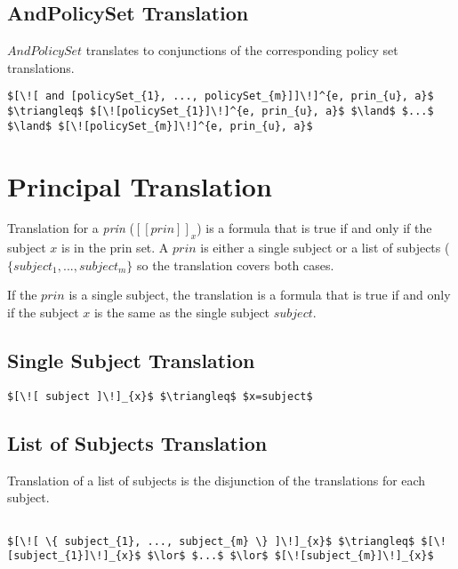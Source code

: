 \subsection{AndPolicySet Translation}
$AndPolicySet$ translates to conjunctions of the corresponding policy set translations. 

\lstset{mathescape, language=AST}  
\begin{lstlisting}[frame=single, caption={Policy Set Translation {$\colon$} AndPolicySet},label={lst:transpolicyformulaAndPolicySet}]
$[\![ and [policySet_{1}, ..., policySet_{m}]]\!]^{e, prin_{u}, a}$ $\triangleq$ $[\![policySet_{1}]\!]^{e, prin_{u}, a}$ $\land$ $...$ $\land$ $[\![policySet_{m}]\!]^{e, prin_{u}, a}$

\end{lstlisting}

\section{Principal Translation}
Translation for a \emph{prin} ($[\![ prin ]\!]_{x}$) is a formula that is true if and only if the subject $x$ is in the prin set. A $prin$ is either a single subject or a list of subjects ($\{ subject_{1}, ..., subject_{m} \}$ so the translation covers both cases. 


If the $prin$ is a single subject, the translation is a formula that is true if and only if the subject $x$ is the same as the single subject $subject$.

\subsection{Single Subject Translation}
\lstset{mathescape, language=AST}  
\begin{lstlisting}[frame=single, caption={Prin Translation {$\colon$} Single subject},label={lst:transprinSingle}]
$[\![ subject ]\!]_{x}$ $\triangleq$ $x=subject$
\end{lstlisting}

\subsection{List of Subjects Translation}
Translation of a list of subjects is the disjunction of the translations for each subject.

\lstset{mathescape, language=AST}  
\begin{lstlisting}[frame=single, caption={Prin Translation {$\colon$} List of subjects},label={lst:transprinListOfSubjects}]

$[\![ \{ subject_{1}, ..., subject_{m} \} ]\!]_{x}$ $\triangleq$ $[\![subject_{1}]\!]_{x}$ $\lor$ $...$ $\lor$ $[\![subject_{m}]\!]_{x}$

\end{lstlisting}




